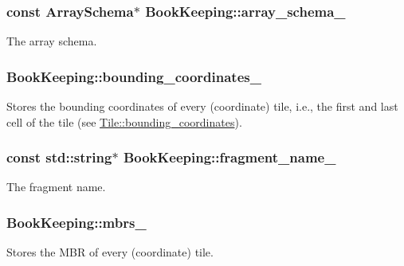 \subsubsection[{array\+\_\+schema\+\_\+}]{\setlength{\rightskip}{0pt plus 5cm}const {\bf Array\+Schema}$\ast$ Book\+Keeping\+::array\+\_\+schema\+\_\+\hspace{0.3cm}{\ttfamily [private]}}\label{classBookKeeping_aeea198496f12889838389eaa6d0761ef}
The array schema. \hypertarget{classBookKeeping_a58112c72f1ee2d6bd902a5a32be67741}{}
\subsubsection[{bounding\+\_\+coordinates\+\_\+}]{ Book\+Keeping\+::bounding\+\_\+coordinates\+\_\+\hspace{0.3cm}{\ttfamily [private]}}\label{classBookKeeping_a58112c72f1ee2d6bd902a5a32be67741}
Stores the bounding coordinates of every (coordinate) tile, i.\+e., the first and last cell of the tile (see \hyperlink{classTile_a797e4ed2dca8ac72d7b618bce2c62133}{Tile\+::bounding\+\_\+coordinates}). \hypertarget{classBookKeeping_a169c2f606ef697f977717a687105ced9}{}
\subsubsection[{fragment\+\_\+name\+\_\+}]{\setlength{\rightskip}{0pt plus 5cm}const std\+::string$\ast$ Book\+Keeping\+::fragment\+\_\+name\+\_\+\hspace{0.3cm}{\ttfamily [private]}}\label{classBookKeeping_a169c2f606ef697f977717a687105ced9}
The fragment name. \hypertarget{classBookKeeping_a2e13bd47a7642e8e6e5062f9f7c8d664}{}
\subsubsection[{mbrs\+\_\+}]{ Book\+Keeping\+::mbrs\+\_\+\hspace{0.3cm}{\ttfamily [private]}}\label{classBookKeeping_a2e13bd47a7642e8e6e5062f9f7c8d664}
Stores the M\+B\+R of every (coordinate) tile. \hypertarget{classBookKeeping_a7e5a14bb84511e4066f3b387805cb640}{}
